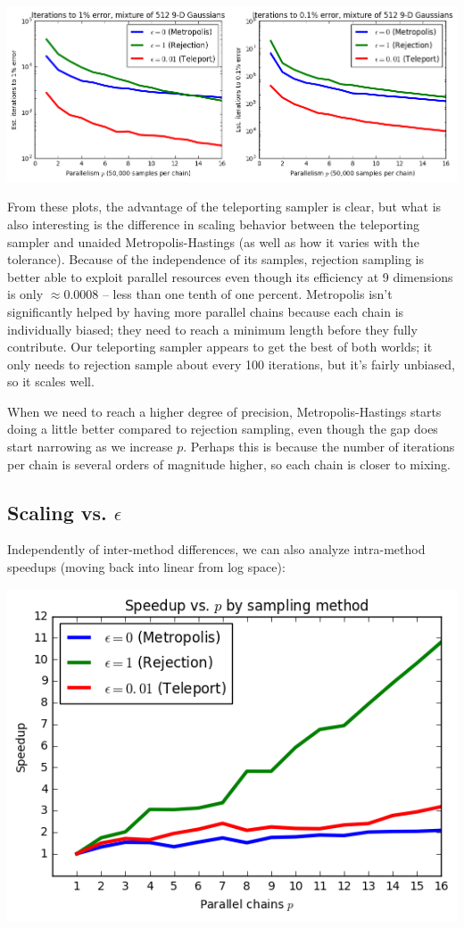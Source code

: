 \documentclass{article}
\begin{document}
\includegraphics[width=\textwidth]{time2tol.png}

From these plots, the advantage of the teleporting sampler is clear, but what
is also interesting is the difference in scaling behavior between the
teleporting sampler and unaided Metropolis-Hastings (as well as how it varies
with the tolerance). Because of the independence of its samples, rejection
sampling is better able to exploit parallel resources even though its
efficiency at 9 dimensions is only $\approx 0.0008$ -- less than one tenth
of one percent. Metropolis isn't significantly helped by having more parallel
chains because each chain is individually biased; they need to reach a minimum
length before they fully contribute. Our teleporting sampler appears to get the
best of both worlds; it only needs to rejection sample about every 100
iterations, but it's fairly unbiased, so it scales well.

When we need to reach a higher degree of precision, Metropolis-Hastings starts
doing a little better compared to rejection sampling, even though the gap does
start narrowing as we increase $p$. Perhaps this is because the number of
iterations per chain is several orders of magnitude higher, so each chain is
closer to mixing.

\subsection{Scaling vs. \(\epsilon\)}

Independently of inter-method differences, we can also analyze intra-method
speedups (moving back into linear from log space):

\includegraphics[width=\textwidth]{speedup-comp.png}
\end{document}
